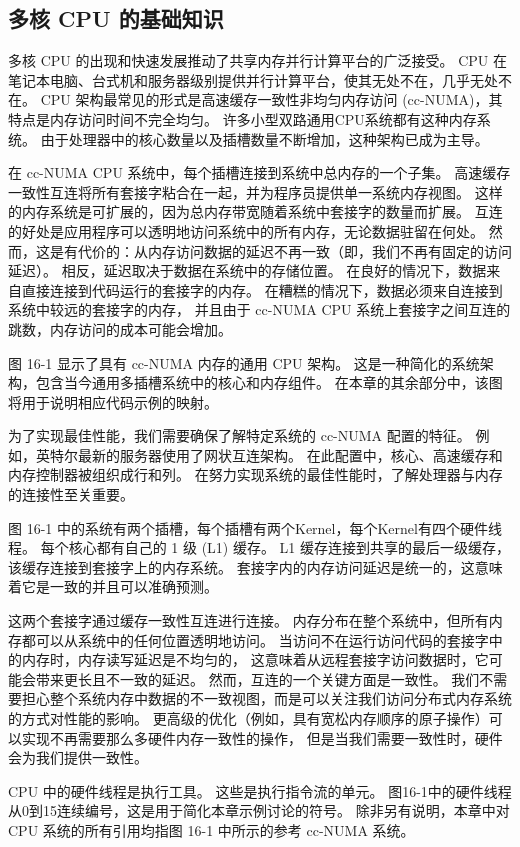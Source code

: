 \subsection{多核 CPU 的基础知识}
多核 CPU 的出现和快速发展推动了共享内存并行计算平台的广泛接受。 
CPU 在笔记本电脑、台式机和服务器级别提供并行计算平台，使其无处不在，几乎无处不在。 
CPU 架构最常见的形式是高速缓存一致性非均匀内存访问 (cc-NUMA)，其特点是内存访问时间不完全均匀。 
许多小型双路通用CPU系统都有这种内存系统。 由于处理器中的核心数量以及插槽数量不断增加，这种架构已成为主导。

在 cc-NUMA CPU 系统中，每个插槽连接到系统中总内存的一个子集。 
高速缓存一致性互连将所有套接字粘合在一起，并为程序员提供单一系统内存视图。 
这样的内存系统是可扩展的，因为总内存带宽随着系统中套接字的数量而扩展。 
互连的好处是应用程序可以透明地访问系统中的所有内存，无论数据驻留在何处。 
然而，这是有代价的：从内存访问数据的延迟不再一致（即，我们不再有固定的访问延迟）。 
相反，延迟取决于数据在系统中的存储位置。 在良好的情况下，数据来自直接连接到代码运行的套接字的内存。 
在糟糕的情况下，数据必须来自连接到系统中较远的套接字的内存，
并且由于 cc-NUMA CPU 系统上套接字之间互连的跳数，内存访问的成本可能会增加。

图 16-1 显示了具有 cc-NUMA 内存的通用 CPU 架构。 
这是一种简化的系统架构，包含当今通用多插槽系统中的核心和内存组件。 
在本章的其余部分中，该图将用于说明相应代码示例的映射。

为了实现最佳性能，我们需要确保了解特定系统的 cc-NUMA 配置的特征。 
例如，英特尔最新的服务器使用了网状互连架构。 
在此配置中，核心、高速缓存和内存控制器被组织成行和列。 
在努力实现系统的最佳性能时，了解处理器与内存的连接性至关重要。

图 16-1 中的系统有两个插槽，每个插槽有两个Kernel，每个Kernel有四个硬件线程。 
每个核心都有自己的 1 级 (L1) 缓存。 L1 缓存连接到共享的最后一级缓存，该缓存连接到套接字上的内存系统。 
套接字内的内存访问延迟是统一的，这意味着它是一致的并且可以准确预测。

这两个套接字通过缓存一致性互连进行连接。 内存分布在整个系统中，但所有内存都可以从系统中的任何位置透明地访问。 
当访问不在运行访问代码的套接字中的内存时，内存读写延迟是不均匀的，
这意味着从远程套接字访问数据时，它可能会带来更长且不一致的延迟。 
然而，互连的一个关键方面是一致性。 
我们不需要担心整个系统内存中数据的不一致视图，而是可以关注我们访问分布式内存系统的方式对性能的影响。 
更高级的优化（例如，具有宽松内存顺序的原子操作）可以实现不再需要那么多硬件内存一致性的操作，
但是当我们需要一致性时，硬件会为我们提供一致性。

CPU 中的硬件线程是执行工具。 这些是执行指令流的单元。 
图16-1中的硬件线程从0到15连续编号，这是用于简化本章示例讨论的符号。 
除非另有说明，本章中对 CPU 系统的所有引用均指图 16-1 中所示的参考 cc-NUMA 系统。

